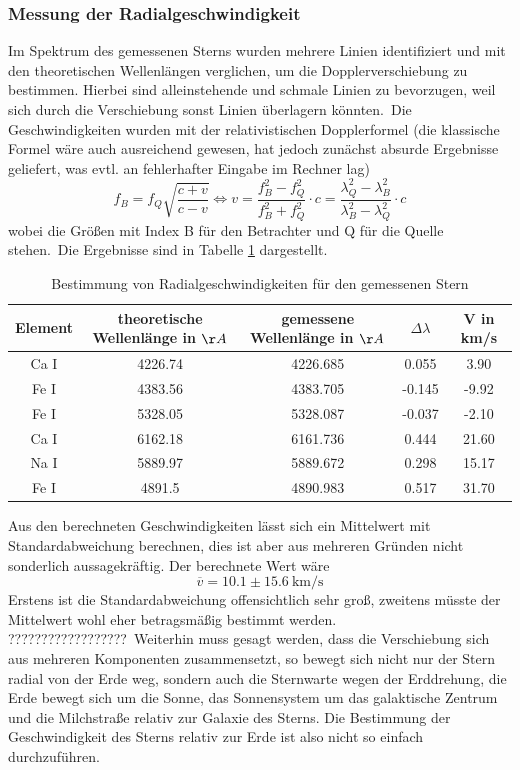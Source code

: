 \subsubsection{Messung der Radialgeschwindigkeit}
Im Spektrum des gemessenen Sterns wurden mehrere Linien identifiziert und mit den theoretischen Wellenlängen verglichen, um die Dopplerverschiebung zu bestimmen. Hierbei sind alleinstehende und schmale Linien zu bevorzugen, weil sich durch die Verschiebung sonst Linien überlagern könnten.\
Die Geschwindigkeiten wurden mit der relativistischen Dopplerformel (die klassische Formel wäre auch ausreichend gewesen, hat jedoch zunächst absurde Ergebnisse geliefert, was evtl. an fehlerhafter Eingabe im Rechner lag)
\begin{equation}
f_B = f_Q \sqrt{\frac{c+v}{c-v}} \Leftrightarrow v = \frac{f_B^2 - f_Q^2}{f_B^2 + f_Q^2} \cdot c = \frac{\lambda_Q^2 - \lambda_B^2}{\lambda_B^2 - \lambda_Q^2}\cdot c
\end{equation}
wobei die Größen mit Index B für den Betrachter und Q für die Quelle stehen.\
Die Ergebnisse sind in Tabelle \ref{tab:Radial} dargestellt.

\begin{table}[htbp]
\begin{tabular}{c|c|c|c|c}
Element & theoretische Wellenlänge in $\AA$ & gemessene Wellenlänge in $\AA$ & $\Delta\lambda$ & V in km/s \\ \hline
Ca I & 4226.74 & 4226.685 & 0.055 & 3.90 \\ 
Fe I & 4383.56 & 4383.705 & -0.145 & -9.92 \\ 
Fe I & 5328.05 & 5328.087 & -0.037 & -2.10 \\ 
Ca I & 6162.18 & 6161.736 & 0.444 & 21.60 \\ 
Na I & 5889.97 & 5889.672 & 0.298 & 15.17 \\ 
Fe I & 4891.5 & 4890.983 & 0.517 & 31.70 \\ 
\end{tabular}
\caption{Bestimmung von Radialgeschwindigkeiten für den gemessenen Stern}
\label{tab:Radial}
\end{table}

Aus den berechneten Geschwindigkeiten lässt sich ein Mittelwert mit Standardabweichung berechnen, dies ist aber aus mehreren Gründen nicht sonderlich aussagekräftig. Der berechnete Wert wäre
\begin{equation}
\overline{v} = 10.1 \pm 15.6 \ \mathrm{km/s}
\end{equation}
Erstens ist die Standardabweichung offensichtlich sehr groß, zweitens müsste der Mittelwert wohl eher betragsmäßig bestimmt werden. ??????????????????\
Weiterhin muss gesagt werden, dass die Verschiebung sich aus mehreren Komponenten zusammensetzt, so bewegt sich nicht nur der Stern radial von der Erde weg, sondern auch die Sternwarte wegen der Erddrehung, die Erde bewegt sich um die Sonne, das Sonnensystem um das galaktische Zentrum und die Milchstraße relativ zur Galaxie des Sterns. Die Bestimmung der Geschwindigkeit des Sterns relativ zur Erde ist also nicht so einfach durchzuführen. 


